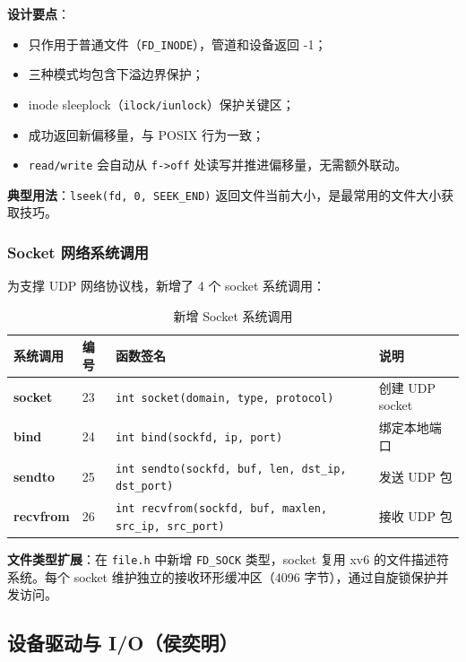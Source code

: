 \documentclass[12pt,a4paper]{ctexart}
\begin{document}
\textbf{设计要点}：
\begin{itemize}
  \item 只作用于普通文件（\texttt{FD\_INODE}），管道和设备返回 -1；
  \item 三种模式均包含下溢边界保护；
  \item inode sleeplock（\texttt{ilock/iunlock}）保护关键区；
  \item 成功返回新偏移量，与 POSIX 行为一致；
  \item \texttt{read/write} 会自动从 \texttt{f->off} 处读写并推进偏移量，无需额外联动。
\end{itemize}

\textbf{典型用法}：\texttt{lseek(fd, 0, SEEK\_END)} 返回文件当前大小，是最常用的文件大小获取技巧。

\subsubsection{Socket 网络系统调用}

为支撑 UDP 网络协议栈，新增了 4 个 socket 系统调用：

\begin{table}[H]
\centering
\caption{新增 Socket 系统调用}
\begin{tabular}{>{\bfseries}p{1.5cm}p{1cm}p{4.5cm}p{4cm}}
\toprule
\textbf{系统调用} & \textbf{编号} & \textbf{函数签名} & \textbf{说明} \\
\midrule
socket   & 23 & \texttt{int socket(domain, type, protocol)} & 创建 UDP socket \\
bind     & 24 & \texttt{int bind(sockfd, ip, port)} & 绑定本地端口 \\
sendto   & 25 & \texttt{int sendto(sockfd, buf, len, dst\_ip, dst\_port)} & 发送 UDP 包 \\
recvfrom & 26 & \texttt{int recvfrom(sockfd, buf, maxlen, src\_ip, src\_port)} & 接收 UDP 包 \\
\bottomrule
\end{tabular}
\end{table}

\textbf{文件类型扩展}：在 \texttt{file.h} 中新增 \texttt{FD\_SOCK} 类型，socket 复用 xv6 的文件描述符系统。每个 socket 维护独立的接收环形缓冲区（4096 字节），通过自旋锁保护并发访问。

\subsection{设备驱动与 I/O（侯奕明）}
\end{document}
